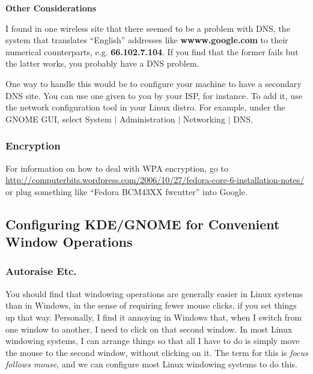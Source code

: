 \documentclass[11pt]{article}
\begin{document}
% 

\textbf{Other Considerations}

I found in one wireless site that there seemed to be a problem with DNS,
the system that translates ``English'' addresses like {\bf
wwww.google.com} to their numerical counterparts, e.g.
{\bf 66.102.7.104}.  If you find that the former fails but the latter
works, you probably have a DNS problem.  

One way to handle this would be to configure your machine to have a
secondary DNS site.  You can use one given to you by your ISP, for
instance.  To add it, use the network configuration tool in your Linux
distro.  For example, under the GNOME GUI, select System $|$
Administration $|$ Networking $|$ DNS.

\subsubsection{Encryption}

For information on how to deal with WPA encryption, go to
\url{http://computerbits.wordpress.com/2006/10/27/fedora-core-6-installation-notes/}
or plug something like ``Fedora BCM43XX fwcutter'' into Google.

\subsection{Configuring KDE/GNOME for Convenient Window Operations}
\label{config}

\subsubsection{Autoraise Etc.}

You should find that windowing operations are generally easier in Linux
systems than in Windows, in the sense of requiring fewer mouse clicks,
if you set things up that way.  Personally, I find it annoying in
Windows that, when I switch from one window to another, I need to click
on that second window.  In most Linux windowing systems, I can arrange
things so that all I have to do is simply move the mouse to the second
window, without clicking on it.  The term for this is {\it focus follows
mouse}, and we can configure most Linux windowing systems to do this.
\end{document}
